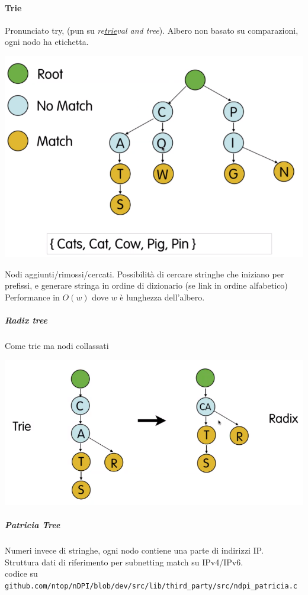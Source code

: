 \documentclass[10pt]{book}
\begin{document}
\paragraph{Trie} Pronunciato try, (pun su \textit{re\underline{trie}val and tree}). Albero non basato su comparazioni, ogni nodo ha etichetta.
\begin{center}
	\includegraphics[scale=0.5]{tries.png}
\end{center}
Nodi aggiunti/rimossi/cercati. Possibilità di cercare stringhe che iniziano per prefissi, e generare stringa in ordine di dizionario (se link in ordine alfabetico)
Performance in $O(w)$ dove $w$ è lunghezza dell'albero.
\subparagraph{Radix tree} Come trie ma nodi collassati
\begin{center}
	\includegraphics[scale=0.5]{radixtrie.png}
\end{center}
\subparagraph{Patricia Tree} Numeri invece di stringhe, ogni nodo contiene una parte di indirizzi IP.\\
Struttura dati di riferimento per subnetting match su IPv4/IPv6.\\
codice su \texttt{github.com/ntop/nDPI/blob/dev/src/lib/third\_party/src/ndpi\_patricia.c}
\end{document}
